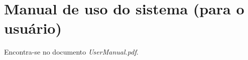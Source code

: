 \section{Manual de uso do sistema (para o usuário)}

Encontra-se no documento \emph{UserManual.pdf}.
